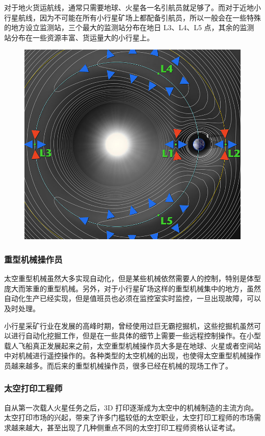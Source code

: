 \documentclass[letterpaper,10pt]{sphinxmanual}
\begin{document}
对于地火货运航线，通常只需要地球、火星各一名引航员就足够了。而对于近地小行星航线，因为不可能在所有小行星矿场上都配备引航员，所以一般会在一些特殊的地方设立监测站，三个最大的监测站分布在地日 L3、L4、L5 点，其余的监测站分布在一些资源丰富、货运量大的小行星上。
\begin{figure}[htbp]
\centering

\includegraphics{800px-Lagrange_points.jpg}
\end{figure}


\subsubsection{重型机械操作员}
\label{profession:id6}
太空重型机械虽然大多实现自动化，但是某些机械依然需要人的控制，特别是体型庞大而笨重的重型机械。另外，对于小行星矿场这样的重型机械集中的地方，虽然自动化生产已经实现，但是值班员也必须在监控室实时监控，一旦出现故障，可以及时处理。

小行星采矿行业在发展的高峰时期，曾经使用过巨无霸挖掘机，这些挖掘机虽然可以进行自动化挖掘工作，但是在一些具体的细节上需要一些远程控制操作。在小型载人飞船真正发展起来之前，太空重型机械操作员大多是在地球、火星或者空间站中对机械进行遥控操作的。各种类型的太空机械的出现，也使得太空重型机械操作员越来越多。而后来的重型机械操作员，很多已经在机械的现场工作了。


\subsubsection{太空打印工程师}
\label{profession:id7}
自从第一次载人火星任务之后，3D 打印逐渐成为太空中的机械制造的主流方向。太空打印市场的兴起，带来了许多门槛较低的太空职业，太空打印工程师的市场需求越来越大，甚至出现了几种侧重点不同的太空打印工程师资格认证考试。
\end{document}
